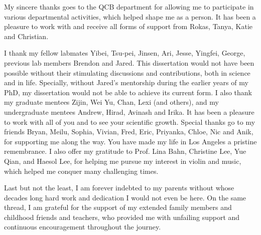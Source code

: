 My sincere thanks goes to the QCB department for allowing me to participate in various departmental activities, which helped shape me as a person. It has been a pleasure to work with and receive all forms of support from Rokas, Tanya, Katie and Christian.

I thank my fellow labmates Yibei, Tsu-pei, Jinsen, Ari, Jesse, Yingfei, George, previous lab members Brendon and Jared. This dissertation would not have been possible without their stimulating discussions and contributions, both in science and in life. Specially, without Jared's mentorship during the earlier years of my PhD, my dissertation would not be able to achieve its current form. I also thank my graduate mentees Zijin, Wei Yu, Chan, Lexi (and others), and my undergraduate mentees Andrew, Hirad, Avinash and Irika. It has been a pleasure to work with all of you and to see your scientific growth. 
Special thanks go to my friends Bryan, Meilu, Sophia, Vivian, Fred, Eric, Priyanka, Chloe, Nic and Anik, for supporting me along the way. You have made my life in Los Angeles a pristine remembrance. I also offer my gratitude to Prof. Lina Bahn, Christine Lee, Yue Qian, and Haesol Lee, for helping me pursue my interest in violin and music, which helped me conquer many challenging times.

Last but not the least, I am forever indebted to my parents without whose decades long hard work and dedication I would not even be here. On the same thread, I am grateful for the support of my extended family members and childhood friends and teachers, who provided me with unfailing support and continuous encouragement throughout the journey.